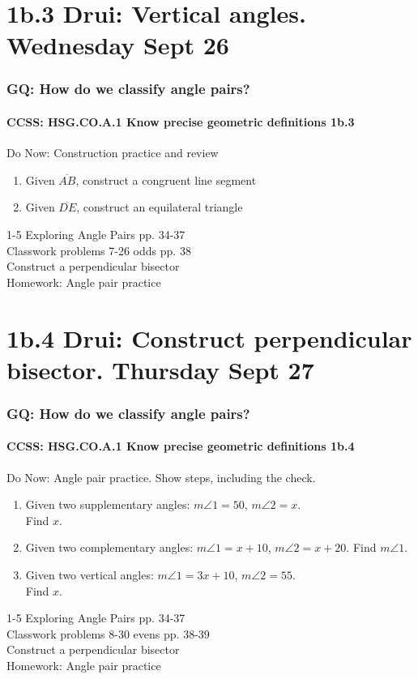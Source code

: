 \documentclass{beamer}
\begin{document}
    
\section{1b.3 Drui: Vertical angles. Wednesday Sept 26}
  \frame
  {
    \frametitle{GQ: How do we classify angle pairs?}
    \framesubtitle{CCSS: HSG.CO.A.1 Know precise geometric definitions  \alert{1b.3}}

    \begin{block}{Do Now: Construction practice and review}
    \begin{enumerate}
        \item Given $\overline{AB}$, construct a congruent line segment
        \item Given $\overline{DE}$, construct an equilateral triangle
    \end{enumerate}
    \end{block}
    1-5 Exploring Angle Pairs pp. 34-37\\
    Classwork problems 7-26 odds pp. 38\\
    Construct a perpendicular bisector \\
    \vspace{0.5cm}
    Homework: Angle pair practice
  }

\section{1b.4 Drui: Construct perpendicular bisector. Thursday Sept 27}
  \frame
  {
    \frametitle{GQ: How do we classify angle pairs?}
    \framesubtitle{CCSS: HSG.CO.A.1 Know precise geometric definitions  \alert{1b.4}}

    \begin{block}{Do Now: Angle pair practice. Show steps, including the check.}
    \begin{enumerate}
        \item Given two supplementary angles: $m \angle 1 = 50$, $m \angle 2 = x$.\\ Find $x$.
        \item Given two complementary angles: $m \angle 1 = x+10$, $m \angle 2 = x+20$. Find $m \angle 1$.
        \item Given two vertical angles: $m \angle 1 = 3x+10$, $m \angle 2 = 55$.\\ Find $x$.
    \end{enumerate}
    \end{block}
    1-5 Exploring Angle Pairs pp. 34-37\\
    Classwork problems 8-30 evens pp. 38-39\\
    Construct a perpendicular bisector \\
    \vspace{0.2cm}
    Homework: Angle pair practice
  }
\end{document}

